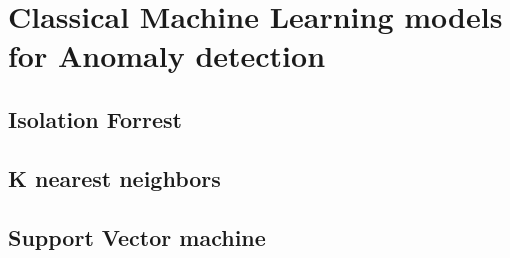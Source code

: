 \section{Classical Machine Learning models for Anomaly detection}

\subsection{Isolation Forrest}
\subsection{K nearest neighbors}
\subsection{Support Vector machine}